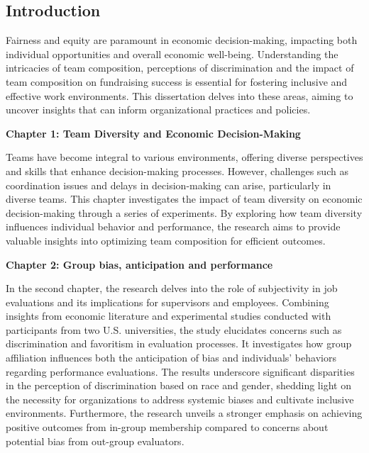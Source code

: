 
% 
\thispagestyle{empty} %
\doublespacing

\begin{center}
\section*{Introduction}\label{sec:intro}
\end{center}

Fairness and equity are paramount in economic decision-making, impacting both individual opportunities and overall economic well-being.  Understanding the intricacies of team composition, perceptions of discrimination and the impact of team composition on fundraising success is essential for fostering inclusive and effective work environments. This dissertation delves into these areas, aiming to uncover insights that can inform organizational practices and policies.

\textbf{Chapter 1: Team Diversity and Economic Decision-Making}

Teams have become integral to various environments, offering diverse perspectives and skills that enhance decision-making processes. However, challenges such as coordination issues and delays in decision-making can arise, particularly in diverse teams. This chapter investigates the impact of team diversity on economic decision-making through a series of experiments. By exploring how team diversity influences individual behavior and performance, the research aims to provide valuable insights into optimizing team composition for efficient outcomes.

\textbf{Chapter 2: Group bias, anticipation and performance }

In the second chapter, the research delves into the role of subjectivity in job evaluations and its implications for supervisors and employees. Combining insights from economic literature and experimental studies conducted with participants from two U.S. universities, the study elucidates concerns such as discrimination and favoritism in evaluation processes. It investigates how group affiliation influences both the anticipation of bias and individuals' behaviors regarding performance evaluations. The results underscore significant disparities in the perception of discrimination based on race and gender, shedding light on the necessity for organizations to address systemic biases and cultivate inclusive environments. Furthermore, the research unveils a stronger emphasis on achieving positive outcomes from in-group membership compared to concerns about potential bias from out-group evaluators.

